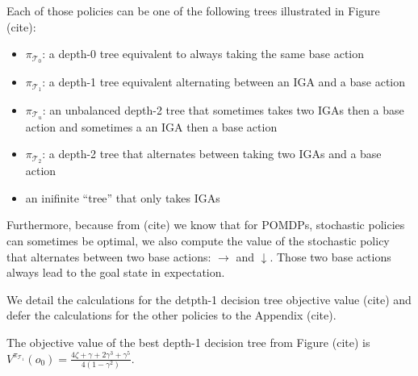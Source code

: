 Each of those policies can be one of the following trees illustrated in Figure (cite): 
\begin{itemize}
    \item $\pi_{\mathcal{T}_0}$: a depth-0 tree equivalent to always taking the same base action 
    \item $\pi_{\mathcal{T}_1}$: a depth-1 tree equivalent alternating between an IGA and a base action 
    \item $\pi_{\mathcal{T}_u}$: an unbalanced depth-2 tree that sometimes takes two IGAs then a base action and sometimes a an IGA then a base action
    \item $\pi_{\mathcal{T}_2}$: a depth-2 tree that alternates between taking two IGAs and a base action
    \item an inifinite ``tree'' that only takes IGAs
\end{itemize}
Furthermore, because from (cite) we know that for POMDPs, stochastic policies can sometimes be optimal, we also compute the value of the stochastic policy that alternates between two base actions: $\rightarrow$ and $\downarrow$.
Those two base actions always lead to the goal state in expectation.

We detail the calculations for the detpth-1 decision tree objective value (cite) and defer the calculations for the other policies to the Appendix (cite).

\begin{proposition} The objective value of the best depth-1 decision tree from Figure (cite) is $V^{\pi_{\mathcal{T}_1}}(o_0) = \frac{4\zeta + \gamma + 2\gamma^3 + \gamma^5}{4(1-\gamma^2)}$.
\end{proposition}

